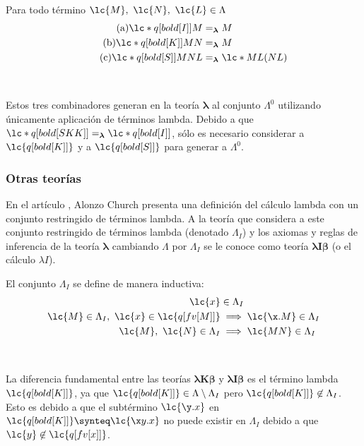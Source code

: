 \begin{cor} Para todo término \(\lc{M},\ \lc{N},\ \lc{L} \in \Lambda\)
  \begin{align}
    \tag{a}
    \lc*{q[bold[I]] M} &=_{\boldsymbol{\lambda}} M \\
    \tag{b}
    \lc*{q[bold[K]] M N} &=_{\boldsymbol{\lambda}} M \\
    \tag{c}
    \lc*{q[bold[S]] M N L} &=_{\boldsymbol{\lambda}} \lc*{M L(N L)}
  \end{align}
\end{cor} \

Estos tres combinadores generan en la teoría \(\boldsymbol{\lambda}\) al conjunto \(\Lambda^{0}\) utilizando únicamente aplicación de términos lambda.  Debido a que \(\lc*{q[bold[S K K]]}=_{\boldsymbol{\lambda}} \lc*{q[bold[I]]}\), sólo es necesario considerar a \(\lc{q[bold[K]]}\) y a \(\lc{q[bold[S]]}\) para generar a \(\Lambda^{0}\). \\

\subsubsection{Otras teorías}

En el artículo \cite{Church:LambdaConversion}, Alonzo Church presenta una definición del cálculo lambda con un conjunto restringido de términos lambda. A la teoría que considera a este conjunto restringido de términos lambda (denotado \(\Lambda_{I}\)) y los axiomas y reglas de inferencia de la teoría \(\boldsymbol{\lambda}\) cambiando \(\Lambda\) por \(\Lambda_{I}\) se le conoce como teoría \(\boldsymbol{\lambda I \beta}\) (o el cálculo \(\lambda I\)). \\

\begin{defi} El conjunto \(\Lambda_{I}\) se define de manera inductiva:
  \label{definicion:lambdaI}
  \begin{align*}
    \lc{x} &\in \Lambda_{I} \\
    \lc{M}\in \Lambda_{I},\ \lc{x} \in \lc{q[fv[M]]} &\implies \lc{\x.M} \in
  \Lambda_{I} \\
    \lc{M},\ \lc{N} \in \Lambda_{I} &\implies \lc{M N} \in \Lambda_{I}
  \end{align*}
\end{defi} \

La diferencia fundamental entre las teorías \(\boldsymbol{\lambda K \beta}\) y \(\boldsymbol{\lambda I \beta}\) es el término lambda \(\lc{q[bold[K]]}\), ya que \(\lc{q[bold[K]]} \in \Lambda \setminus \Lambda_{I}\) pero \(\lc{q[bold[K]]} \not\in \Lambda_{I}\). Esto es debido a que el subtérmino \(\lc{\y.x}\) en \(\lc{q[bold[K]]}\synteq \lc{\x y.x}\) no puede existir en \(\Lambda_{I}\) debido a que \(\lc{y} \not\in \lc{q[fv[x]]}\). \\



